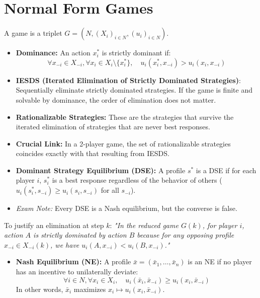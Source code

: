 \documentclass[10pt,a4paper]{article}
\begin{document}
\section{Normal Form Games}
A game is a triplet $G = (N, (X_i)_{i \in N}, (u_i)_{i \in N})$.
\begin{itemize}[leftmargin=*]
    \item \textbf{Dominance:} An action $x_i^*$ is strictly dominant if:
    \[ \forall x_{-i} \in X_{-i}, \forall x_i \in X_i \setminus \{x_i^*\}, \quad u_i(x_i^*, x_{-i}) > u_i(x_i, x_{-i}) \]
    \item \textbf{IESDS (Iterated Elimination of Strictly Dominated Strategies)}:
    Sequentially eliminate strictly dominated strategies. If the game is finite and solvable by dominance, the order of elimination does not matter.
\end{itemize}

\begin{itemize}[leftmargin=*]
    \item \textbf{Rationalizable Strategies:} These are the strategies that survive the iterated elimination of strategies that are never best responses.
    \item \textbf{Crucial Link:} In a 2-player game, the set of rationalizable strategies coincides exactly with that resulting from IESDS.
    \item \textbf{Dominant Strategy Equilibrium (DSE):} A profile $s^*$ is a DSE if for each player $i$, $s_i^*$ is a best response regardless of the behavior of others ($u_i(s_i^*, s_{-i}) \geq u_i(s_i, s_{-i})$ for all $s_{-i}$).
    \item \textit{Exam Note:} Every DSE is a Nash equilibrium, but the converse is false.
\end{itemize}

\begin{tcolorbox}[colback=blue!5,colframe=myblue,title=Exam Rigor: IESDS Wording]
To justify an elimination at step $k$:
\textit{"In the reduced game $G(k)$, for player $i$, action $A$ is strictly dominated by action $B$ because for any opposing profile $x_{-i} \in X_{-i}(k)$, we have $u_i(A, x_{-i}) < u_i(B, x_{-i})$."}
\end{tcolorbox}

\begin{itemize}[leftmargin=*]
    \item \textbf{Nash Equilibrium (NE):} A profile $\bar{x} = (\bar{x}_1, \dots, \bar{x}_n)$ is an NE if no player has an incentive to unilaterally deviate:
    \[ \forall i \in N, \forall x_i \in X_i, \quad u_i(\bar{x}_i, \bar{x}_{-i}) \geq u_i(x_i, \bar{x}_{-i}) \]
    In other words, $\bar{x}_i$ maximizes $x_i \mapsto u_i(x_i, \bar{x}_{-i})$.
\end{itemize}
\end{document}
